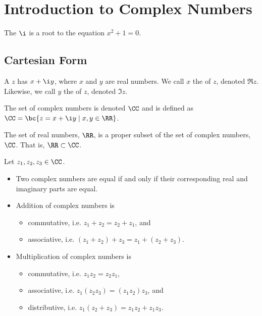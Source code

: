 \chapter{Introduction to Complex Numbers}\label{chap:Introduction-to-Complex-Numbers}

\begin{definition}
    The  $\i$ is a root to the equation $x^2 + 1 = 0$.
\end{definition}

\section{Cartesian Form}

\begin{definition}
    A  $z$ has  $x + \i y$, where $x$ and $y$ are real numbers. We call $x$ the  of $z$, denoted $\Re z$. Likewise, we call $y$ the  of $z$, denoted $\Im z$.
\end{definition}

\begin{definition}
    The set of complex numbers is denoted $\CC$ and is defined as $\CC = \bc{z = x + \i y \mid x, y \in \RR}$.
\end{definition}
\begin{remark}
    The set of real numbers, $\RR$, is a proper subset of the set of complex numbers, $\CC$. That is, $\RR \subset \CC$.
\end{remark}

\begin{fact}
    Let $z_1, z_2, z_3 \in \CC$.
    \begin{itemize}
        \item Two complex numbers are equal if and only if their corresponding real and imaginary parts are equal.
        \item Addition of complex numbers is
        \begin{itemize}
            \item commutative, i.e. $z_1 + z_2 = z_2 + z_1$, and
            \item associative, i.e. $(z_1 + z_2) + z_3 = z_1 + (z_2 + z_3)$.
        \end{itemize}
        \item Multiplication of complex numbers is
        \begin{itemize}
            \item commutative, i.e. $z_1z_2 = z_2z_1$,
            \item associative, i.e. $z_1(z_2z_3) = (z_1z_2)z_3$, and
            \item distributive, i.e. $z_1(z_2 + z_3) = z_1z_2 + z_1z_3$.
        \end{itemize}
    \end{itemize}
\end{fact}

